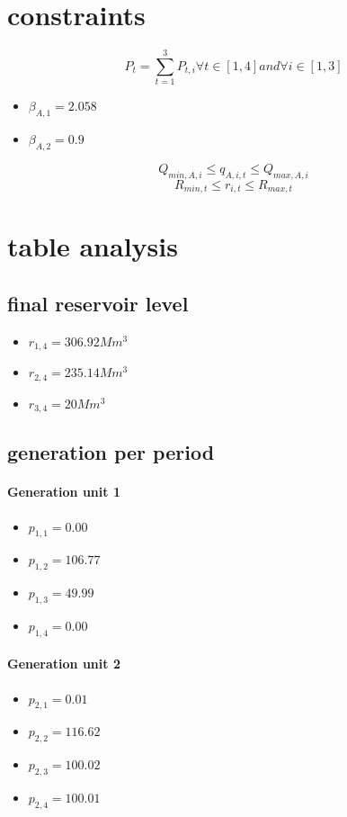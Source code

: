 \documentclass{article}
\begin{document}
\section{constraints}
\begin{equation}
P_t=\sum_{t=1}^{3}P_{t,i} \forall t\in [1,4] and \forall i\in [1,3]
\end{equation}
\begin{itemize}
\item $\beta_{A,1}=2.058$
\item $\beta_{A,2}=0.9$
\end{itemize}
\begin{equation}
Q_{min,A,i}\leq q_{A,i,t}\leq Q_{max,A,i}
\end{equation}
\begin{equation}
R_{min,t}\leq r_{i,t}\leq R_{max,t}
\end{equation}
\section{table analysis}
\subsection{final reservoir level}
\begin{itemize}
\item $r_{1,4}=306.92 Mm^3$
\item $r_{2,4}=235.14 Mm^3$
\item $r_{3,4}=20 Mm^3$
\end{itemize}
\subsection{generation per period}
\paragraph{Generation unit 1}
\begin{itemize}
\item $p_{1,1}=0.00$
\item $p_{1,2}=106.77$
\item $p_{1,3}=49.99$
\item $p_{1,4}=0.00$
\end{itemize}
\paragraph{Generation unit 2}
\begin{itemize}
\item $p_{2,1}=0.01$
\item $p_{2,2}=116.62$
\item $p_{2,3}=100.02$
\item $p_{2,4}=100.01$
\end{itemize}
\end{document}
